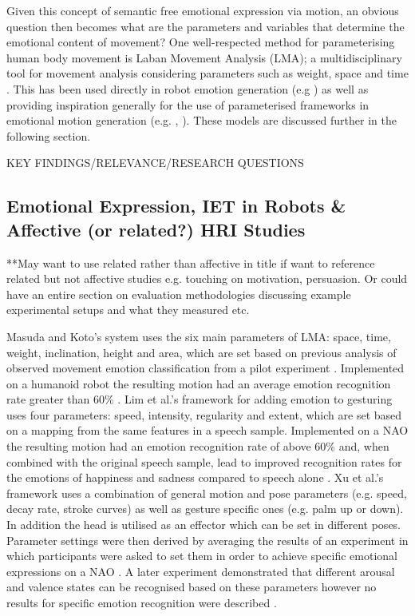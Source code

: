 \documentclass[11pt]{article}
\begin{document}
Given this concept of semantic free emotional expression via motion, an obvious question then becomes what are the parameters and variables that determine the emotional content of movement? One well-respected method for parameterising human body movement is Laban Movement Analysis (LMA); a multidisciplinary tool for movement analysis considering parameters such as weight, space and time \cite{lab2011}. This has been used directly in robot emotion generation (e.g \cite{masuda2010motion}) as well as providing inspiration generally for the use of parameterised frameworks in emotional motion generation (e.g. \cite{lim2011converting}, \cite{xu2013mood}). These models are discussed further in the following section.

KEY FINDINGS/RELEVANCE/RESEARCH QUESTIONS

\subsection{Emotional Expression, IET in Robots \& Affective (or related?) HRI Studies}

**May want to use related rather than affective in title if want to reference related but not affective studies e.g. touching on motivation, persuasion. Or could have an entire section on evaluation methodologies discussing example experimental setups and what they measured etc. 

Masuda and Koto's system uses the six main parameters of LMA: space, time, weight, inclination, height and area, which are set based on previous analysis of observed movement emotion classification from a pilot experiment \cite{masuda2009emotion}. Implemented on a humanoid robot the resulting motion had an average emotion recognition rate greater than 60\% \cite{masuda2010motion}. Lim et al.'s framework for adding emotion to gesturing uses four parameters: speed, intensity, regularity and extent, which are set based on a mapping from the same features in a speech sample. Implemented on a NAO the resulting motion had an emotion recognition rate of above 60\% and, when combined with the original speech sample, lead to improved recognition rates for the emotions of happiness and sadness compared to speech alone \cite{lim2011converting}. Xu et al.'s framework uses a combination of general motion and pose parameters (e.g. speed, decay rate, stroke curves) as well as gesture specific ones (e.g. palm up or down). In addition the head is utilised as an effector which can be set in different poses. Parameter settings were then derived by averaging the results of an experiment in which participants were asked to set them in order to achieve specific emotional expressions on a NAO \cite{xu2013mood}. A later experiment demonstrated that different arousal and valence states can be recognised based on these parameters however no results for specific emotion recognition were described \cite{xu2013bodily}.
\end{document}
